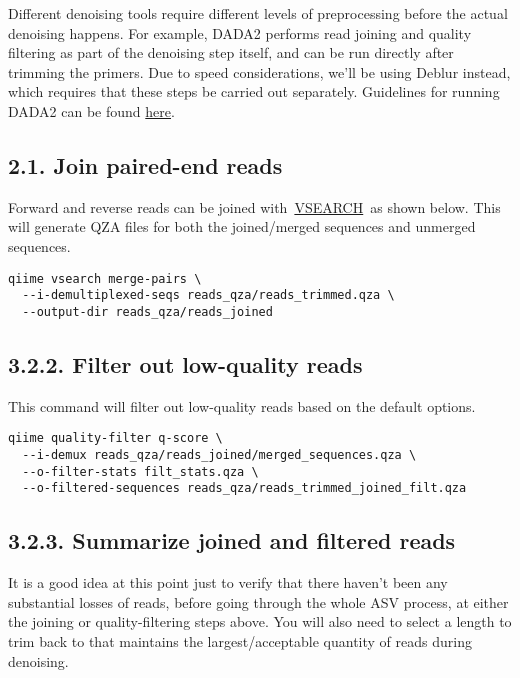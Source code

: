 \documentclass[
]{book}
\begin{document}
Different denoising tools require different levels of preprocessing before the actual denoising happens. For example, DADA2 performs read joining and quality filtering as part of the denoising step itself, and can be run directly after trimming the primers. Due to speed considerations, we'll be using Deblur instead, which requires that these steps be carried out separately. Guidelines for running DADA2 can be found \href{https://github.com/LangilleLab/microbiome_helper/wiki/QIIME2-DADA2-Quick-Reference}{here}.

\subsection{2.1. Join paired-end reads}\label{join-paired-end-reads-2}

Forward and reverse reads can be joined with~\href{https://github.com/torognes/vsearch}{VSEARCH}~as shown below. This will generate QZA files for both the joined/merged sequences and unmerged sequences.

\begin{verbatim}
qiime vsearch merge-pairs \
  --i-demultiplexed-seqs reads_qza/reads_trimmed.qza \
  --output-dir reads_qza/reads_joined
\end{verbatim}

\subsection{3.2.2. Filter out low-quality reads}\label{filter-out-low-quality-reads-2}

This command will filter out low-quality reads based on the default options.

\begin{verbatim}
qiime quality-filter q-score \
  --i-demux reads_qza/reads_joined/merged_sequences.qza \
  --o-filter-stats filt_stats.qza \
  --o-filtered-sequences reads_qza/reads_trimmed_joined_filt.qza
\end{verbatim}

\subsection{3.2.3. Summarize joined and filtered reads}\label{summarize-joined-and-filtered-reads-2}

It is a good idea at this point just to verify that there haven't been any substantial losses of reads, before going through the whole ASV process, at either the joining or quality-filtering steps above. You will also need to select a length to trim back to that maintains the largest/acceptable quantity of reads during denoising.
\end{document}
